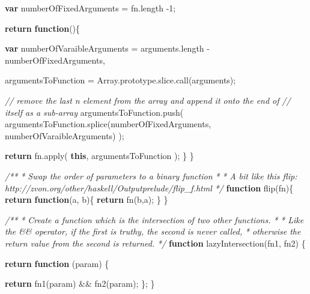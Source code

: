 \documentclass[]{article}
\newenvironment{Shaded}{}{}
\newcommand{\KeywordTok}[1]{\textcolor[rgb]{0.00,0.44,0.13}{\textbf{{#1}}}}
\newcommand{\DecValTok}[1]{\textcolor[rgb]{0.25,0.63,0.44}{{#1}}}
\newcommand{\CommentTok}[1]{\textcolor[rgb]{0.38,0.63,0.69}{\textit{{#1}}}}
\newcommand{\OtherTok}[1]{\textcolor[rgb]{0.00,0.44,0.13}{{#1}}}
\newcommand{\FunctionTok}[1]{\textcolor[rgb]{0.02,0.16,0.49}{{#1}}}
\newcommand{\NormalTok}[1]{{#1}}
\begin{document}
\begin{Shaded}
\begin{Highlighting}[]
   \KeywordTok{var} \NormalTok{numberOfFixedArguments = }\OtherTok{fn}\NormalTok{.}\FunctionTok{length} \NormalTok{-}\DecValTok{1}\NormalTok{;}
         
   \KeywordTok{return} \KeywordTok{function}\NormalTok{()\{}
   
      \KeywordTok{var} \NormalTok{numberOfVaraibleArguments = }\OtherTok{arguments}\NormalTok{.}\FunctionTok{length} \NormalTok{- numberOfFixedArguments,}
      
          \NormalTok{argumentsToFunction = }\OtherTok{Array}\NormalTok{.}\OtherTok{prototype}\NormalTok{.}\OtherTok{slice}\NormalTok{.}\FunctionTok{call}\NormalTok{(arguments);}
          
      \CommentTok{// remove the last n element from the array and append it onto the end of}
      \CommentTok{// itself as a sub-array}
      \OtherTok{argumentsToFunction}\NormalTok{.}\FunctionTok{push}\NormalTok{( }
         \OtherTok{argumentsToFunction}\NormalTok{.}\FunctionTok{splice}\NormalTok{(numberOfFixedArguments, numberOfVaraibleArguments)}
      \NormalTok{);   }
      
      \KeywordTok{return} \OtherTok{fn}\NormalTok{.}\FunctionTok{apply}\NormalTok{( }\KeywordTok{this}\NormalTok{, argumentsToFunction );}
   \NormalTok{\}       }
\NormalTok{\}}


\CommentTok{/**}
\CommentTok{ * Swap the order of parameters to a binary function}
\CommentTok{ * }
\CommentTok{ * A bit like this flip: http://zvon.org/other/haskell/Outputprelude/flip_f.html}
\CommentTok{ */}
\KeywordTok{function} \FunctionTok{flip}\NormalTok{(fn)\{}
   \KeywordTok{return} \KeywordTok{function}\NormalTok{(a, b)\{}
      \KeywordTok{return} \FunctionTok{fn}\NormalTok{(b,a);}
   \NormalTok{\}}
\NormalTok{\}}


\CommentTok{/**}
\CommentTok{ * Create a function which is the intersection of two other functions.}
\CommentTok{ * }
\CommentTok{ * Like the && operator, if the first is truthy, the second is never called,}
\CommentTok{ * otherwise the return value from the second is returned.}
\CommentTok{ */}
\KeywordTok{function} \FunctionTok{lazyIntersection}\NormalTok{(fn1, fn2) \{}

   \KeywordTok{return} \KeywordTok{function} \NormalTok{(param) \{}
                                                              
      \KeywordTok{return} \FunctionTok{fn1}\NormalTok{(param) && }\FunctionTok{fn2}\NormalTok{(param);}
   \NormalTok{\};   }
\NormalTok{\}}

\end{Highlighting}
\end{Shaded}
\end{document}
